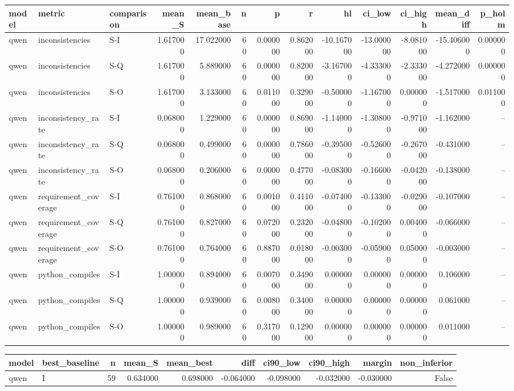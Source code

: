 \begin{tabular}{lllrrrrrrrrrr}
\toprule
model & metric & comparison & mean_S & mean_base & n & p & r & hl & ci_low & ci_high & mean_diff & p_holm \\
\midrule
qwen & inconsistencies & S-I & 1.617000 & 17.022000 & 60 & 0.000000 & 0.862000 & -10.167000 & -13.000000 & -8.081000 & -15.406000 & 0.000000 \\
qwen & inconsistencies & S-Q & 1.617000 & 5.889000 & 60 & 0.000000 & 0.820000 & -3.167000 & -4.333000 & -2.333000 & -4.272000 & 0.000000 \\
qwen & inconsistencies & S-O & 1.617000 & 3.133000 & 60 & 0.011000 & 0.329000 & -0.500000 & -1.167000 & 0.000000 & -1.517000 & 0.011000 \\
qwen & inconsistency_rate & S-I & 0.068000 & 1.229000 & 60 & 0.000000 & 0.869000 & -1.140000 & -1.308000 & -0.971000 & -1.162000 & -- \\
qwen & inconsistency_rate & S-Q & 0.068000 & 0.499000 & 60 & 0.000000 & 0.786000 & -0.395000 & -0.526000 & -0.267000 & -0.431000 & -- \\
qwen & inconsistency_rate & S-O & 0.068000 & 0.206000 & 60 & 0.000000 & 0.477000 & -0.083000 & -0.166000 & -0.042000 & -0.138000 & -- \\
qwen & requirement_coverage & S-I & 0.761000 & 0.868000 & 60 & 0.001000 & 0.411000 & -0.074000 & -0.133000 & -0.029000 & -0.107000 & -- \\
qwen & requirement_coverage & S-Q & 0.761000 & 0.827000 & 60 & 0.072000 & 0.232000 & -0.048000 & -0.102000 & 0.004000 & -0.066000 & -- \\
qwen & requirement_coverage & S-O & 0.761000 & 0.764000 & 60 & 0.887000 & 0.018000 & -0.003000 & -0.059000 & 0.050000 & -0.003000 & -- \\
qwen & python_compiles & S-I & 1.000000 & 0.894000 & 60 & 0.007000 & 0.349000 & 0.000000 & 0.000000 & 0.000000 & 0.106000 & -- \\
qwen & python_compiles & S-Q & 1.000000 & 0.939000 & 60 & 0.008000 & 0.340000 & 0.000000 & 0.000000 & 0.000000 & 0.061000 & -- \\
qwen & python_compiles & S-O & 1.000000 & 0.989000 & 60 & 0.317000 & 0.129000 & 0.000000 & 0.000000 & 0.000000 & 0.011000 & -- \\
\bottomrule
\end{tabular}


\begin{tabular}{llrrrrrrrr}
\toprule
model & best_baseline & n & mean_S & mean_best & diff & ci90_low & ci90_high & margin & non_inferior \\
\midrule
qwen & I & 59 & 0.634000 & 0.698000 & -0.064000 & -0.098000 & -0.032000 & -0.030000 & False \\
\bottomrule
\end{tabular}


